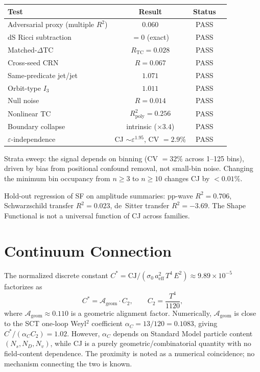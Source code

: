 \documentclass[12pt,a4paper]{article}
\begin{document}
\begin{center}
\begin{tabular}{lccl}
\toprule
Test & Result & Status \\
\midrule
Adversarial proxy (multiple $R^2$) & 0.060 & PASS \\
dS Ricci subtraction & $= 0$ (exact) & PASS \\
Matched-$\Delta$TC & $R_{\mathrm{TC}} = 0.028$ & PASS \\
Cross-seed CRN & $R = 0.067$ & PASS \\
Same-predicate jet/jet & $1.071$ & PASS \\
Orbit-type $I_3$ & $1.011$ & PASS \\
Null noise & $R = 0.014$ & PASS \\
Nonlinear TC & $R^2_{\mathrm{poly}} = 0.256$ & PASS \\
Boundary collapse & intrinsic ($\times 3.4$) & PASS \\
$\varepsilon$-independence & CJ $\sim \varepsilon^{1.95}$, CV $= 2.9\%$ & PASS \\
\bottomrule
\end{tabular}
\end{center}

\noindent Strata sweep: the signal depends on binning (CV $= 32\%$ across 1--125 bins), driven by bias from positional confound removal, not small-bin noise. Changing the minimum bin occupancy from $n \geq 3$ to $n \geq 10$ changes CJ by $< 0.01\%$.

\noindent Hold-out regression of SF on amplitude summaries: pp-wave $R^2 = 0.706$, Schwarzschild transfer $R^2 = 0.023$, de~Sitter transfer $R^2 = -3.69$. The Shape Functional is not a universal function of CJ across families.

\section{Continuum Connection}

The normalized discrete constant $C^* = \mathrm{CJ}/(\sigma_0\,a_{\mathrm{eff}}^2\,T^4\,E^2) \approx 9.89 \times 10^{-5}$ factorizes as
\begin{equation}
  C^* = \mathcal{A}_{\mathrm{geom}} \cdot C_2, \qquad C_2 = \frac{T^4}{1120},
\end{equation}
where $\mathcal{A}_{\mathrm{geom}} \approx 0.110$ is a geometric alignment factor. Numerically, $\mathcal{A}_{\mathrm{geom}}$ is close to the SCT one-loop Weyl$^2$ coefficient $\alpha_C = 13/120 = 0.1083$, giving $C^*/(\alpha_C C_2) = 1.02$. However, $\alpha_C$ depends on Standard Model particle content $(N_s, N_D, N_v)$, while CJ is a purely geometric/combinatorial quantity with no field-content dependence. The proximity is noted as a numerical coincidence; no mechanism connecting the two is known.
\end{document}
